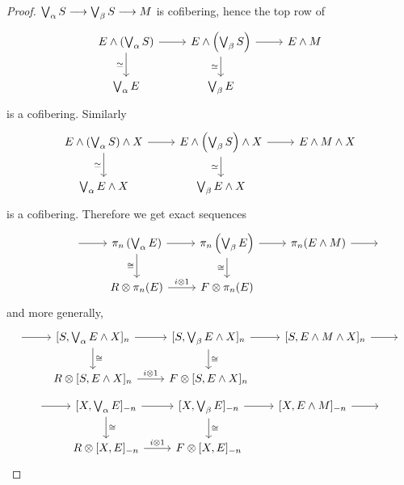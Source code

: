 \documentclass[../main]{subfiles}
\begin{document}
\begin{proof}
$\bigvee_\alpha S\longrightarrow \bigvee_\beta S\longrightarrow M$ is cofibering, hence the top row of
\[\begin{tikzcd}
	{E\wedge\left( \bigvee_\alpha S\right)} & {E\wedge\left( \bigvee_\beta S\right)} & {E\wedge M} \\
	{\bigvee_\alpha E} & {\bigvee_\beta E}
	\arrow[from=1-1, to=1-2]
	\arrow[from=1-2, to=1-3]
	\arrow["\simeq"', from=1-2, to=2-2]
	\arrow["\simeq"', from=1-1, to=2-1]
\end{tikzcd}\]
is a cofibering. Similarly
\[\begin{tikzcd}
	{E\wedge\left( \bigvee_\alpha S\right)\wedge X} & {E\wedge\left( \bigvee_\beta S\right)\wedge X} & {E\wedge M \wedge X} \\
	{\bigvee_\alpha E \wedge X} & {\bigvee_\beta E \wedge X}
	\arrow[from=1-1, to=1-2]
	\arrow[from=1-2, to=1-3]
	\arrow["\simeq"', from=1-2, to=2-2]
	\arrow["\simeq"', from=1-1, to=2-1]
\end{tikzcd}\]
is a cofibering. Therefore we get exact sequences
\[\begin{tikzcd}
	{} & {} & {\pi_n\left( \bigvee_\alpha E \right)} & {\pi_n \left( \bigvee_\beta E \right)} & {\pi_n(E\wedge M)} & {} \\
	&& {R\otimes \pi_n(E)} & {F\otimes \pi_n(E)}
	\arrow[from=1-4, to=1-5]
	\arrow[from=1-5, to=1-6]
	\arrow["\cong"', from=1-4, to=2-4]
	\arrow[from=1-3, to=1-4]
	\arrow["{i\otimes 1}", from=2-3, to=2-4]
	\arrow["\cong"', from=1-3, to=2-3]
	\arrow[from=1-2, to=1-3]
\end{tikzcd}\]
and more generally,
\[\begin{tikzcd}
	{} & {[S, \bigvee_\alpha E\wedge X]_n} & {[S, \bigvee_\beta E\wedge X]_n} & {[S, E\wedge M\wedge X]_n} & {} \\
	& {R\otimes [S, E\wedge X]_n} & {F\otimes [S, E\wedge X]_n}
	\arrow[from=1-1, to=1-2]
	\arrow[from=1-2, to=1-3]
	\arrow[from=1-3, to=1-4]
	\arrow[from=1-4, to=1-5]
	\arrow["\cong", from=1-2, to=2-2]
	\arrow["\cong", from=1-3, to=2-3]
	\arrow["{i\otimes 1}", from=2-2, to=2-3]
\end{tikzcd}\]
\[\begin{tikzcd}
	{} & {[X, \bigvee_\alpha E]_{-n}} & {[X, \bigvee_\beta E]_{-n}} & {[X, E\wedge M]_{-n}} & {} \\
	& {R\otimes [X, E]_{-n}} & {F\otimes [X, E]_{-n}}
	\arrow[from=1-1, to=1-2]
	\arrow[from=1-2, to=1-3]
	\arrow[from=1-3, to=1-4]
	\arrow[from=1-4, to=1-5]
	\arrow["\cong", from=1-2, to=2-2]
	\arrow["\cong", from=1-3, to=2-3]
	\arrow["{i\otimes 1}", from=2-2, to=2-3]
\end{tikzcd}\]
\end{proof}
\end{document}
